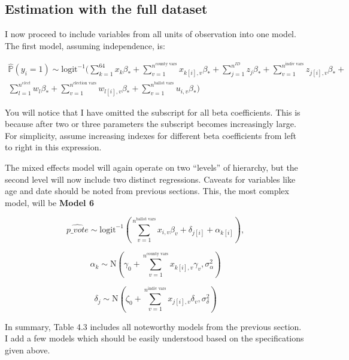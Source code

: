 \documentclass[12pt,twoside]{reedthesis}
\begin{document}
  \subsection{Estimation with the full
  dataset}\label{estimation-with-the-full-dataset}
  
  I now proceed to include variables from all units of observation into
  one model. The first model, assuming independence, is:
  
  \begin{multline*}
  \hat{\mathbb{P}}(y_i = 1) \sim \text{logit}^{-1}(\sum_{k = 1}^{64}x_{k}\beta_{*} + \sum_{v=1}^{n^{\text{county vars}}}x_{k[i], v}\beta_{*} + \sum_{j = 1}^{n^{ID}}z_{j}\beta_{*} + \sum_{v=1}^{n^{\text{indiv vars}}}z_{j[i], v}\beta_{*} + \\
  \sum_{l = 1}^{n^{elect}}w_{l}\beta_{*} + \sum_{v=1}^{n^{\text{election vars}}}w_{l[i], v}\beta_{*} + \sum_{v = 1}^{n^{\text{ballot vars}}}u_{i,v}\beta_{*})
  \end{multline*}
  
  You will notice that I have omitted the subscript for all beta
  coefficients. This is because after two or three parameters the
  subscript becomes increasingly large. For simplicity, assume increasing
  indexes for different beta coefficients from left to right in this
  expression.
  
  The mixed effects model will again operate on two ``levels'' of
  hierarchy, but the second level will now include two distinct
  regressions. Caveats for variables like age and date should be noted
  from previous sections. This, the most complex model, will be
  \textbf{Model 6}
  
  \begin{equation} \tag{Model 6}
  \hat{p\_vote} \sim \text{logit}^{-1}(\sum_{v = 1}^{n^{\text{ballot vars}}}x_{i,v}\beta_{v} +\delta_{j[i]} + \alpha_{k[i]}),
  \end{equation}
  
  \[\alpha_{k} \sim \text{N}(\gamma_0 + \sum_{v=1}^{n^{\text{county vars}}}x_{k[i], v}\gamma_{v}, \sigma_{\alpha}^2)\]
  
  \[\delta_{j} \sim \text{N}(\zeta_0 + \sum_{v=1}^{n^{\text{indiv vars}}}x_{j[i], v}\delta_{v}, \sigma_{\delta}^2)\]
  
  In summary, Table 4.3 includes all noteworthy models from the previous
  section. I add a few models which should be easily understood based on
  the specifications given above.
  
\end{document}
